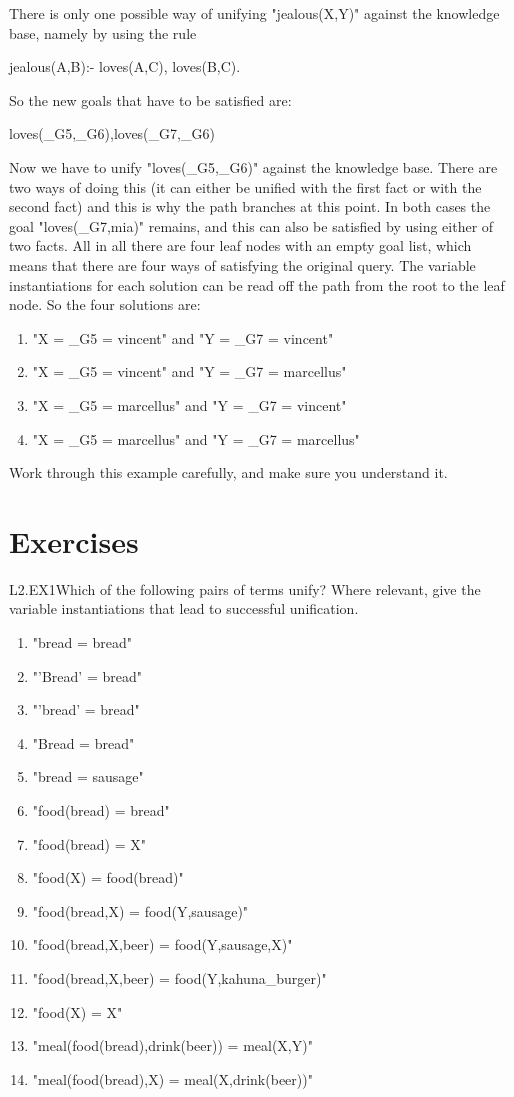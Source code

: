 There is only one possible way of unifying "jealous(X,Y)" against the
knowledge base, namely by using the rule
\begin{LPNcodedisplay}
jealous(A,B):- loves(A,C), loves(B,C).
\end{LPNcodedisplay}
%
So the new goals that have to be satisfied are:
\begin{LPNcodedisplay}
loves(_G5,_G6),loves(_G7,_G6)
\end{LPNcodedisplay}
Now we have to unify "loves(_G5,_G6)" against the knowledge base.
There are two ways of doing this (it can either be unified with the
first fact or with the second fact) and this is why the path branches
at this point. In both cases the goal "loves(_G7,mia)" remains, and
this can also be satisfied by using  either of two facts.  All in
all there are four leaf nodes with an empty goal list, which means
that there are four ways of satisfying the original query. The
variable instantiations for each solution can be read off the path
from the root to the leaf node. So the four solutions are:
\begin{enumerate}
\item{}"X = _G5 = vincent" and
"Y = _G7 = vincent"
\item{}"X = _G5 = vincent" and
"Y = _G7 = marcellus"
\item{}"X = _G5 = marcellus" and
"Y = _G7 = vincent"
\item{}"X = _G5 = marcellus" and
"Y = _G7 = marcellus"
\end{enumerate}
Work through this example carefully, and make sure you understand it.

\section{Exercises}\label{SEC.L2.EXERCISES}

\begin{LPNexercise}{L2.EX1}Which of the following pairs of terms unify?
Where relevant, give the
variable instantiations that lead to successful unification.
\begin{enumerate}
\item{}"bread = bread"
\item{}"'Bread' = bread"
\item{}"'bread' = bread"
\item{}"Bread = bread"
\item{}"bread = sausage"
\item{}"food(bread) = bread"
\item{}"food(bread) = X"
\item{}"food(X) = food(bread)"
\item{}"food(bread,X) = food(Y,sausage)"
\item{}"food(bread,X,beer) = food(Y,sausage,X)"
\item{}"food(bread,X,beer) = food(Y,kahuna_burger)"
\item{}"food(X) = X"
\item{}"meal(food(bread),drink(beer)) = meal(X,Y)"
\item{}"meal(food(bread),X) = meal(X,drink(beer))"
\end{enumerate}
\end{LPNexercise}

